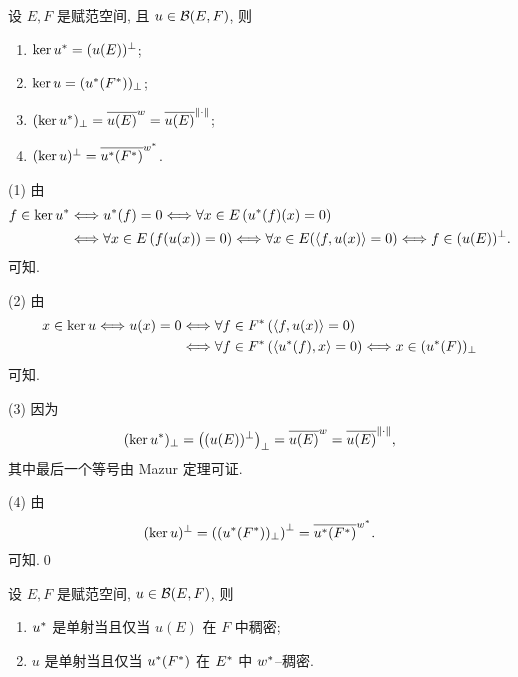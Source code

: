     \begin{Theorem}
        设 $ E, F $ 是赋范空间, 且 $ u\in\mathcal{B}(E, F) $, 则
        \begin{enumerate}[(1)]
            \item $ \ker u^{*}=(u(E))^{\bot} $;
            \item $ \ker u=(u^{*}(F^{*}))_{\bot} $;
            \item $ (\ker u^{*})_{\bot}=\overline{u(E)}^{w}=\overline{u(E)}^{\left\| \cdot \right\|} $;
            \item $ (\ker u)^{\bot}=\overline{u^{*}(F^{*})}^{w^{*}} $.
        \end{enumerate}
    \end{Theorem}
    \begin{Proof}
        (1) 由
        \[
            \begin{aligned}
                f\in\ker u^{*} & \Longleftrightarrow u^{*}(f)=0 \Longleftrightarrow \forall x\in E\,(u^{*}(f)(x)=0)\\
                & \Longleftrightarrow \forall x\in E\,(f(u(x))=0) \Longleftrightarrow \forall x\in E(\left\langle f, u(x) \right\rangle=0)\Longleftrightarrow f\in(u(E))^{\bot}.
            \end{aligned}
        \]
        可知.

        (2) 由
        \[
            \begin{aligned}
                x\in\ker u\Longleftrightarrow u(x)=0 &  \Longleftrightarrow \forall f\in F^{*}\,(\left\langle f, u(x) \right\rangle=0)\\
                & \Longleftrightarrow \forall f\in F^{*}\,(\left\langle u^{*}(f), x \right\rangle=0)\Longleftrightarrow x\in(u^{*}(F))_{\bot}
            \end{aligned}
        \]
        可知.

        (3) 因为
        \[
            (\ker u^{*})_{\bot}=\left( (u(E))^{\bot} \right)_{\bot}=\overline{u(E)}^{w}=\overline{u(E)}^{\left\| \cdot \right\|},
        \]
        其中最后一个等号由 Mazur 定理可证.

        (4) 由
        \[
            (\ker u)^{\bot}=\left( (u^{*}(F^{*}))_{\bot} \right)^{\bot}=\overline{u^{*}(F^{*})}^{w^{*}}.
        \]
        可知.\qed
    \end{Proof}

    \begin{Corollary}
        设 $ E, F $ 是赋范空间, $u\in\mathcal{B}(E, F)$, 则
        \begin{enumerate}[(1)]
            \item $ u^{*} $ 是单射当且仅当 $ u(E) $ 在 $ F $ 中稠密;
            \item $ u $ 是单射当且仅当 $ u^{*}(F^{*}) $ 在 $ E^{*} $ 中 $ w^{*} $--稠密.
        \end{enumerate}
    \end{Corollary}

